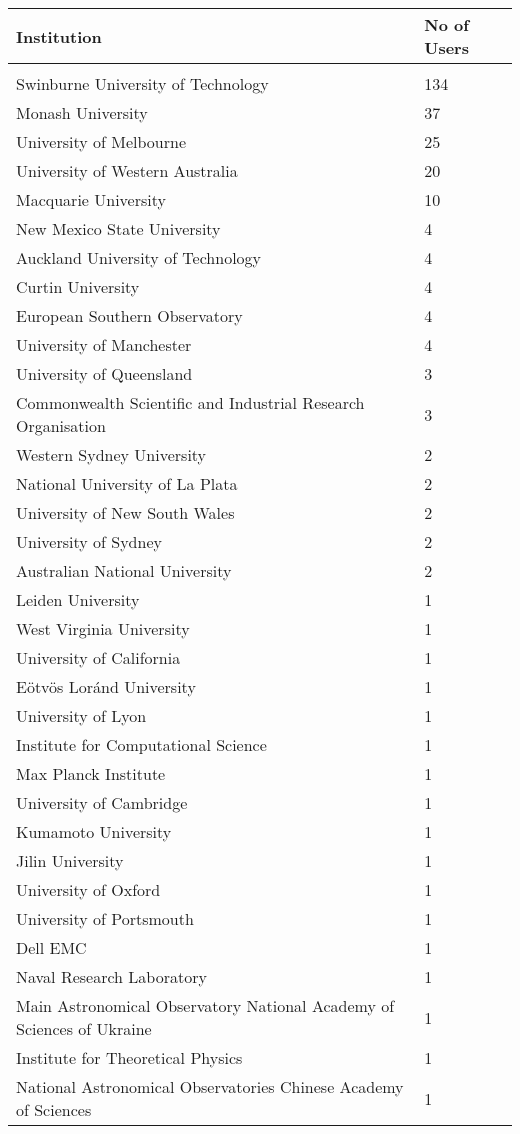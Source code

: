 \documentclass{article}%
\begin{document}
%
\begin{longtabu}{X[l] X[r]}%
\textbf{Institution}&\textbf{No of Users}\\%
\hline%
&\\%
Swinburne University of Technology&134\\%
\hline%
Monash University&37\\%
\hline%
University of Melbourne&25\\%
\hline%
University of Western Australia&20\\%
\hline%
Macquarie University&10\\%
\hline%
New Mexico State University&4\\%
\hline%
Auckland University of Technology&4\\%
\hline%
Curtin University&4\\%
\hline%
European Southern Observatory&4\\%
\hline%
University of Manchester&4\\%
\hline%
University of Queensland&3\\%
\hline%
Commonwealth Scientific and Industrial Research Organisation&3\\%
\hline%
Western Sydney University&2\\%
\hline%
National University of La Plata&2\\%
\hline%
University of New South Wales&2\\%
\hline%
University of Sydney&2\\%
\hline%
Australian National University&2\\%
\hline%
Leiden University&1\\%
\hline%
West Virginia University&1\\%
\hline%
University of California&1\\%
\hline%
Eötvös Loránd University&1\\%
\hline%
University of Lyon&1\\%
\hline%
Institute for Computational Science&1\\%
\hline%
Max Planck Institute&1\\%
\hline%
University of Cambridge&1\\%
\hline%
Kumamoto University&1\\%
\hline%
Jilin University&1\\%
\hline%
University of Oxford&1\\%
\hline%
University of Portsmouth&1\\%
\hline%
Dell EMC&1\\%
\hline%
Naval Research Laboratory&1\\%
\hline%
Main Astronomical Observatory National Academy of Sciences of Ukraine&1\\%
\hline%
Institute for Theoretical Physics&1\\%
\hline%
National Astronomical Observatories Chinese Academy of Sciences&1\\%
\hline%
\end{longtabu}%
\end{document}

